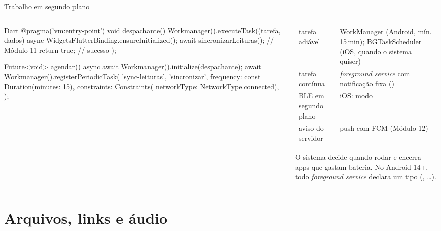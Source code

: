 \documentclass[aspectratio=169,10pt]{beamer}
\begin{document}
\begin{frame}[fragile]{Trabalho em segundo plano}
  \begin{columns}[T]
    \begin{column}{0.54\textwidth}
\begin{codigo}[title=Sincronização periódica (workmanager)]{Dart}
@pragma('vm:entry-point')
void despachante() {
  Workmanager().executeTask((tarefa, dados) async {
    WidgetsFlutterBinding.ensureInitialized();
    await sincronizarLeituras();        // Módulo 11
    return true;                        // sucesso
  });
}

Future<void> agendar() async {
  await Workmanager().initialize(despachante);
  await Workmanager().registerPeriodicTask(
    'sync-leituras', 'sincronizar',
    frequency: const Duration(minutes: 15),
    constraints: Constraints(
        networkType: NetworkType.connected),
  );
}
\end{codigo}
    \end{column}
    \begin{column}{0.44\textwidth}
      \scriptsize
      \begin{tabularx}{\linewidth}{@{}l L@{}}
        \toprule
         &  \\
        \midrule
        tarefa adiável & WorkManager (Android, mín. 15\,min); BGTaskScheduler (iOS, quando o sistema quiser) \\
        tarefa contínua & \emph{foreground service} com notificação fixa () \\
        BLE em segundo plano & iOS: modo  \\
        aviso do servidor & push com FCM (Módulo 12) \\
        \bottomrule
      \end{tabularx}
      \begin{atencao}
        O sistema decide quando rodar e encerra apps que gastam bateria. No Android 14+, todo \emph{foreground service} declara um tipo (, \ldots).
      \end{atencao}
    \end{column}
  \end{columns}
\end{frame}

\section{Arquivos, links e áudio}
\end{document}
